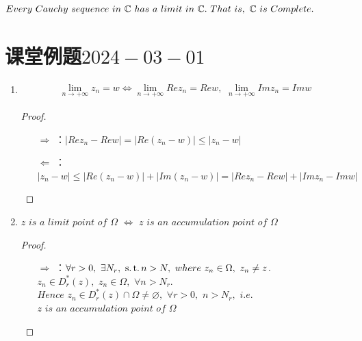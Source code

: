 \vspace*{2em}

	\begin{thm}
		$Every \,\, Cauchy \,\, sequence \,\, in \,\, \mathbb{C} \,\, has \,\, a \,\, limit \,\, in \,\, \mathbb{C} . \,\, That \,\, is , \,\, \mathbb{C} \,\, is \,\, Complete.$
	\end{thm}




\newpage
\section{课堂例题$2024-03-01$}
	\begin{enumerate}
		\item 
		\begin{align}
			\lim_{n \to +\infty}{z_n} = w \Leftrightarrow \lim_{n \to +\infty}{Re z_n} = Re w , \,\, \lim_{n \to +\infty}{Im z_n} = Im w
		\end{align}
		
		\vspace*{2em}
		\begin{proof}
			\begin{enumerate}
				\item[$\Rightarrow$]：$\left| Re z_n - Re w \right| = \left| Re (z_n - w) \right| \leq \left| z_n - w \right|$
				
				\item[$\Leftarrow$]：$\left| z_n - w \right| 
				\leq \left| Re (z_n - w) \right| + \left| Im (z_n - w) \right|
				= \left| Re z_n - Re w \right| + \left| Im z_n - Im w \right|$
			\end{enumerate}
		\end{proof}
	
		\vspace*{2em}
		\item $z \,\, is \,\, a \,\, limit \,\, point \,\, of \,\, \Omega \,\,\Leftrightarrow \,\, z \,\, is \,\, an \,\, accumulation \,\, point \,\, of \,\, \Omega$
		
		\vspace*{2em}
		\begin{proof}
			\begin{enumerate}
				\item[$\Rightarrow$]：$\forall r > 0 , \,\, \exists N_r , \,\, \operatorname{s.t.} n > N , \,\, where \,\, z_n \in \Omega , \,\, z_n \neq z$.\\
				$z_n \in D_{r}^{*}(z) , \,\, z_n \in \Omega , \,\, \forall n > N_r$.\\
				$Hence \,\, z_n \in D_{r}^{*}(z) \cap \Omega \neq \varnothing , \,\, \forall r > 0 , \,\, n > N_r , \,\, i.e. \,\,$\\
				$z \,\, is \,\, an \,\, accumulation \,\, point \,\, of \,\, \Omega$
				

\end{enumerate}
\end{proof}
\end{enumerate}
